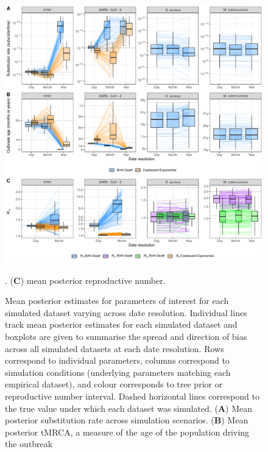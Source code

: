 \documentclass[12pt]{article}
\begin{document}
\begin{spacing}{2}
\begin{figure}[H]
    \centering
    \includegraphics[width=\textwidth]{simulation_parm_panel.pdf}
    \caption{Mean posterior estimates for parameters of interest for each simulated dataset varying across date resolution. Individual lines track mean posterior estimates for each simulated dataset and boxplots are given to summarise the spread and direction of bias across all simulated datasets at each date resolution. Rows correspond to individual parameters, columns correspond to simulation conditions (underlying parameters matching each empirical dataset), and colour corresponds to tree prior or reproductive number interval. Dashed horizontal lines correspond to the true value under which each dataset was simulated. (\textbf{A}) Mean posterior substitution rate across simulation scenarios. (\textbf{B}) Mean posterior tMRCA, a measure of the age of the population driving the outbreak}. (\textbf{C}) mean posterior reproductive number.
    \label{fig:sim-parms}
\end{figure}


\end{spacing}
\end{document}
